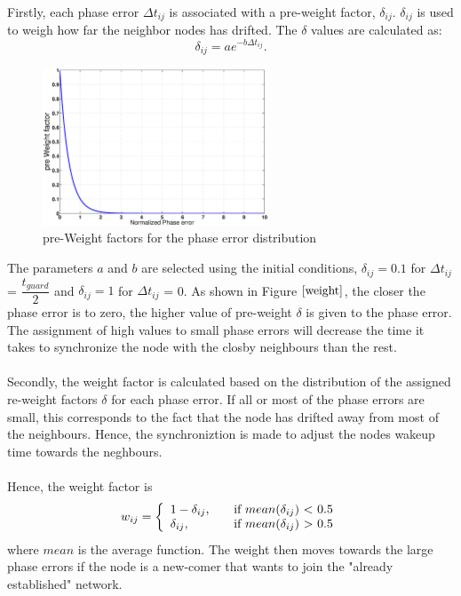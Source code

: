 \documentclass[a4paper,10pt]{report}
\begin{document}
\paragraph*{} \noindent Firstly, each phase error $\Delta t_{ij}$ is
associated with a pre-weight factor, $\delta_{ij}$. $\delta_{ij}$ is
used to weigh how far the neighbor nodes has drifted. The $\delta$
values are calculated as:
\begin{equation}
\delta_{ij} = ae^{-b\Delta t_{ij}}.
\end{equation}
\begin{figure}[t]
\centering
\includegraphics[width= 0.6\textwidth]{weightphase}
\caption{pre-Weight factors for the phase error distribution}
\label{weight}
\end{figure}
The parameters $a$ and $b$ are selected using the initial
conditions, $\delta_{ij}=0.1$ for $\Delta t_{ij}$ =
$\dfrac{t_{guard}}{2}$ and $\delta_{ij}=1$ for $\Delta t_{ij}$ = 0.
As shown in Figure $\ref{weight}$, the closer the phase error is to
zero, the higher value of pre-weight $\delta$ is given to the phase
error. The assignment of high values to small phase errors will
decrease the time it takes to synchronize the node with the closby
neighbours than the rest.
\paragraph*{} \noindent
Secondly, the weight factor is calculated based on the distribution
of the assigned re-weight factors $\delta$ for each phase error. If
all or most of the phase errors are small, this corresponds to the
fact that the node has drifted away from most of the neighbours.
Hence, the synchroniztion is made to adjust the nodes wakeup time
towards the neghbours. \paragraph*{} \noindent Hence, the weight
factor is
\[w_{ij} = \left\{
\begin{array}{l l}
  1 - \delta_{ij},& \quad \mbox{if $mean(\delta_{ij}$) $<$ 0.5}\\
 \delta_{ij}, & \quad \mbox{if $mean(\delta_{ij}$) $>$ 0.5}\\ \end{array} \right. \]
where $mean$ is the average function.
The weight then moves towards the large phase errors if the node is a new-comer that wants to join the "already established" network.
\end{document}
